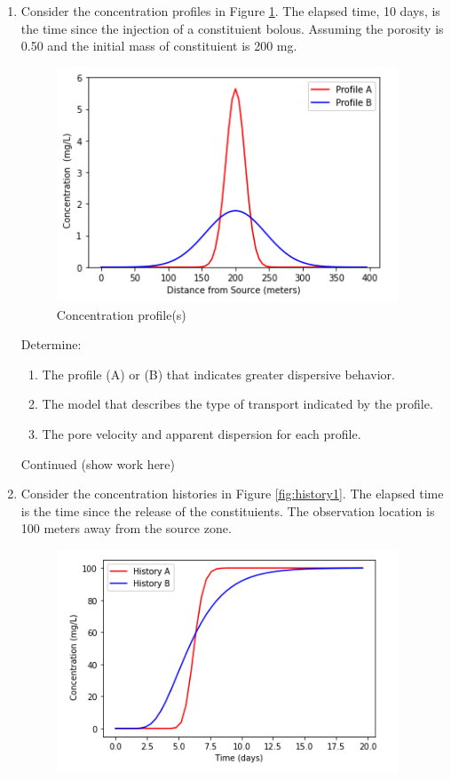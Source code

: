 \documentclass[12pt]{article}
\begin{document}
\begin{enumerate}
\clearpage
\item  Consider the concentration profiles in Figure \ref{fig:profile1}.  The elapsed time, 10 days, is the time since the injection of a constituient bolous.  Assuming the porosity is 0.50 and the initial mass of constituient is 200 mg.
\begin{figure}[h!] %
   \centering
   \includegraphics[width=4in]{profile1.png} 
   \caption{Concentration profile(s)}
   \label{fig:profile1}
\end{figure}
Determine:
\begin{enumerate}
\item The profile (A) or (B) that indicates greater dispersive behavior.
\item The model that describes the type of transport indicated by the profile.
\item The pore velocity and apparent dispersion for each profile.
\end{enumerate}
\clearpage
Continued (show work here)
\clearpage
\item  Consider the concentration histories in Figure \ref{fig:history1}.  The elapsed time is the time since the release of the constituients. The observation location is 100 meters away from the source zone. 
\begin{figure}[h!] %
   \centering
   \includegraphics[width=4in]{history1.png} 

\end{figure}
\end{enumerate}
\end{document}
